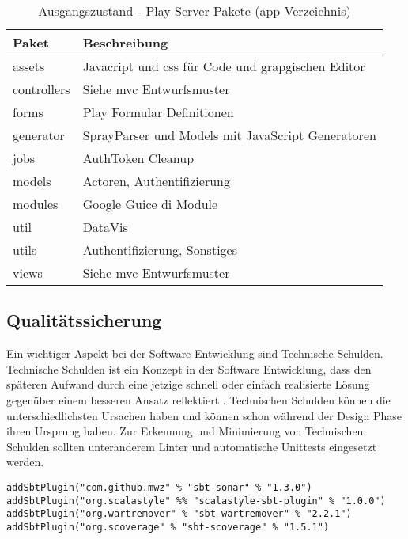 \begin{table}[ht]
    \smallskip
    \centering
    \begin{tabular}{| l | l |}
    \hline
    \bf Paket & \bf Beschreibung \\ \hline
    assets & Javacript und \ac{css} für Code und grapgischen Editor \\ \hline
    controllers & Siehe \ac{mvc} Entwurfsmuster \\ \hline
    forms & Play Formular Definitionen \\ \hline
    generator & SprayParser und Models mit JavaScript Generatoren \\ \hline
    jobs & AuthToken Cleanup \\ \hline
    models & Actoren, Authentifizierung  \\ \hline
    modules & Google Guice \ac{di} Module  \\ \hline
    util & DataVis \\ \hline
    utils & Authentifizierung, Sonstiges\\ \hline
    views & Siehe \ac{mvc} Entwurfsmuster \\ \hline
    \end{tabular}
    \caption{Ausgangszustand - Play Server Pakete (app Verzeichnis)}
    \label{tab:ZETA_PLAY_PACKAGES}
\end{table}

\subsection{Qualitätssicherung}
\label{subsec:REVIEW_QA}

Ein wichtiger Aspekt bei der Software Entwicklung sind Technische Schulden. Technische Schulden ist ein Konzept in der Software Entwicklung, dass den späteren Aufwand durch eine jetzige schnell oder einfach realisierte Lösung gegenüber einem besseren Ansatz reflektiert \cite{technical_debt}. Technischen Schulden können die unterschiedlichsten Ursachen haben und können schon während der Design Phase ihren Ursprung haben. Zur Erkennung und Minimierung von Technischen Schulden sollten unteranderem Linter und automatische Unittests eingesetzt werden.

\bigskip
\begin{lstlisting}[caption={Weiter Tools zur Qualitaetssicherung},label={lst:SBT_LINTER_OLD}]
addSbtPlugin("com.github.mwz" % "sbt-sonar" % "1.3.0")
addSbtPlugin("org.scalastyle" %% "scalastyle-sbt-plugin" % "1.0.0")
addSbtPlugin("org.wartremover" % "sbt-wartremover" % "2.2.1")
addSbtPlugin("org.scoverage" % "sbt-scoverage" % "1.5.1")
\end{lstlisting}
\smallskip

